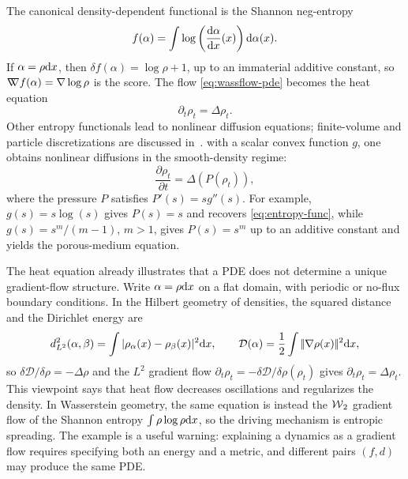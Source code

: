 \begin{example}
The canonical density-dependent functional is the Shannon neg-entropy
   \begin{equation}
       f(\alpha) = \int \log\left(\frac{\mathrm{d} \alpha}{\mathrm{d} x}(x)\right) \mathrm{d} \alpha(x). \label{eq:entropy-func}
   \end{equation}
	   If $\alpha=\rho\mathrm{d} x$, then $\delta f(\alpha) = \log\rho+1$, up to an immaterial additive constant, so $\mathord{\nabla\mkern-9.3mu\nabla} f(\alpha) = \nabla\log\rho$ is the score. The flow \eqref{eq:wassflow-pde} becomes the heat equation
   \begin{equation*}
	       \partial_t \rho_t = \Delta \rho_t.
   \end{equation*}
   Other entropy functionals lead to nonlinear diffusion equations; finite-volume and particle discretizations are discussed in~\citet{CarrilloFiniteVolume,GianazzaARMA,Maas2011,ErbarHeatManifold}.
%
	   with a scalar convex function $g$, one obtains nonlinear diffusions in the smooth-density regime:
   \begin{equation*}
	       \frac{\partial \rho_t}{\partial t} = \Delta(P(\rho_t)),
   \end{equation*}
   where the pressure $P$ satisfies $P'(s)=s g''(s)$. For example, $g(s) = s \log(s)$ gives $P(s)=s$ and recovers \eqref{eq:entropy-func}, while $g(s) = s^m/(m-1)$, $m > 1$, gives $P(s)=s^m$ up to an additive constant and yields the porous-medium equation.
\end{example}

\begin{rem}\label{rem-two-interpretations-heat-equation}
	The heat equation already illustrates that a PDE does not determine a unique gradient-flow structure. Write $\alpha=\rho\mathrm{d} x$ on a flat domain, with periodic or no-flux boundary conditions. In the Hilbert geometry of densities, the squared distance and the Dirichlet energy are
	\[
		d_{L^2}^2(\alpha,\beta)=\int |\rho_\alpha(x)-\rho_\beta(x)|^2\mathrm{d} x,
		\qquad
		\mathcal D(\alpha)=\frac12\int |\!| \nabla\rho(x) |\!|^2\mathrm{d} x,
	\]
	so $\delta\mathcal D/\delta\rho=-\Delta\rho$ and the $L^2$ gradient flow $\partial_t\rho_t=-\delta\mathcal D/\delta\rho(\rho_t)$ gives $\partial_t\rho_t=\Delta\rho_t$. This viewpoint says that heat flow decreases oscillations and regularizes the density. In Wasserstein geometry, the same equation is instead the $\operatorname{\mathcal{W}}_2$ gradient flow of the Shannon entropy $\int \rho\log\rho\mathrm{d} x$, so the driving mechanism is entropic spreading. The example is a useful warning: explaining a dynamics as a gradient flow requires specifying both an energy and a metric, and different pairs $(f,d)$ may produce the same PDE.
\end{rem}

